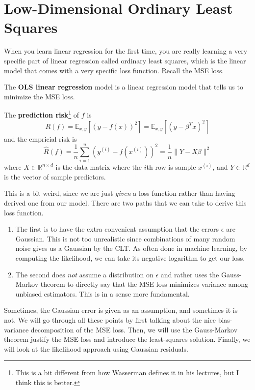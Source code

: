 \section{Low-Dimensional Ordinary Least Squares}

  When you learn linear regression for the first time, you are really learning a very specific part of linear regression called ordinary least squares, which is the linear model that comes with a very specific loss function. Recall the \hyperref[fi-mse_loss]{MSE loss}.

  \begin{definition}
    The \textbf{OLS linear regression} model is a linear regression model that tells us to minimize the MSE loss. 
  \end{definition}

  \begin{theorem}
    The \textbf{prediction risk}\footnote{This is a bit different from how Wasserman defines it in his lectures, but I think this is better.} of $f$ is 
    \begin{equation}
      R(f) = \mathbb{E}_{x, y} [ (y - f(x))^2 ] = \mathbb{E}_{x, y} [ (y - \beta^T x)^2 ] 
    \end{equation}
    and the empricial risk is 
    \begin{equation}
      \hat{R}(f) = \frac{1}{n} \sum_{i=1}^n (y^{(i)} - f(x^{(i)}))^2 = \frac{1}{n} \| Y - X\beta\|^2
    \end{equation}
    where $X \in \mathbb{R}^{n \times d}$ is the data matrix where the $i$th row is sample $x^{(i)}$, and $Y \in \mathbb{R}^{d}$ is the vector of sample predictors. 
  \end{theorem}

  This is a bit weird, since we are just \textit{given} a loss function rather than having derived one from our model. There are two paths that we can take to derive this loss function. 
  \begin{enumerate}
    \item The first is to have the extra convenient assumption that the errors $\epsilon$ are Gaussian. This is not too unrealistic since combinations of many random noise gives us a Gaussian by the CLT. As often done in machine learning, by computing the likelihood, we can take its negative logarithm to get our loss. 
    \item The second does \textit{not} assume a distribution on $\epsilon$ and rather uses the Gauss-Markov theorem to directly say that the MSE loss minimizes variance among unbiased estimators. This is in a sense more fundamental. 
  \end{enumerate}
  Sometimes, the Gaussian error is given as an assumption, and sometimes it is not. We will go through all these points by first talking about the nice bias-variance decomposition of the MSE loss. Then, we will use the Gauss-Markov theorem justify the MSE loss and introduce the least-squares solution. Finally, we will look at the likelihood approach using Gaussian residuals. 

